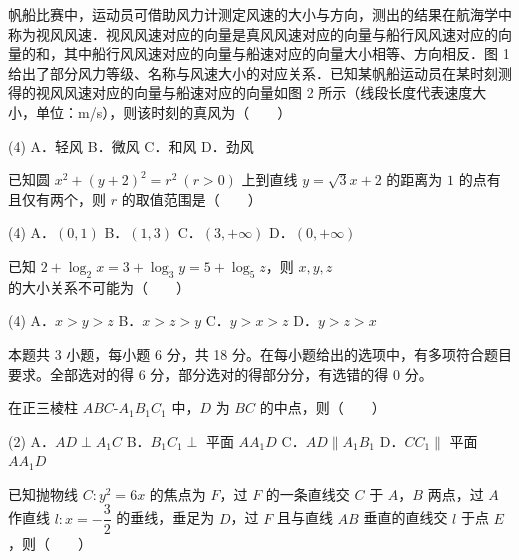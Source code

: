 帆船比赛中，运动员可借助风力计测定风速的大小与方向，测出的结果在航海学中称为视风风速．视风风速对应的向量是真风风速对应的向量与船行风风速对应的向量的和，其中船行风风速对应的向量与船速对应的向量大小相等、方向相反．图 1 给出了部分风力等级、名称与风速大小的对应关系．已知某帆船运动员在某时刻测得的视风风速对应的向量与船速对应的向量如图 2 所示（线段长度代表速度大小，单位：m/s），则该时刻的真风为（　　）

\begin{center}\end{center}

\begin{gkopts}(4)
\task A．轻风
\task B．微风
\task C．和风
\task D．劲风
\end{gkopts}

已知圆 $x^2+(y+2)^2=r^2\ (r>0)$ 上到直线 $y=\sqrt3x+2$ 的距离为 $1$ 的点有且仅有两个，则 $r$ 的取值范围是（　　）

\begin{gkopts}(4)
\task A．$(0,1)$
\task B．$(1,3)$
\task C．$(3,+\infty)$
\task D．$(0,+\infty)$
\end{gkopts}

已知 $2+\log_2 x=3+\log_3 y=5+\log_5 z$，则 $x,y,z$ 的大小关系不可能为（　　）

\begin{gkopts}(4)
\task A．$x>y>z$
\task B．$x>z>y$
\task C．$y>x>z$
\task D．$y>z>x$
\end{gkopts}

\par\medskip


\begin{gktip}
本题共 3 小题，每小题 6 分，共 18 分。在每小题给出的选项中，有多项符合题目要求。全部选对的得 6 分，部分选对的得部分分，有选错的得 0 分。
\end{gktip}

在正三棱柱 $ABC\text{-}A_1B_1C_1$ 中，$D$ 为 $BC$ 的中点，则（　　）

\begin{gkopts}(2)
\task A．$AD\perp A_1C$
\task B．$B_1C_1\perp$ 平面 $AA_1D$
\task C．$AD\parallel A_1B_1$
\task D．$CC_1\parallel$ 平面 $AA_1D$
\end{gkopts}

已知抛物线 $C:y^2=6x$ 的焦点为 $F$，过 $F$ 的一条直线交 $C$ 于 $A$，$B$ 两点，过 $A$ 作直线 $l:x=-\dfrac32$ 的垂线，垂足为 $D$，过 $F$ 且与直线 $AB$ 垂直的直线交 $l$ 于点 $E$，则（　　）

